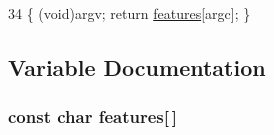 \begin{DoxyCode}
34 \{ (void)argv; \textcolor{keywordflow}{return} \hyperlink{a00016_a1582568e32f689337602a16bf8a5bff0_a1582568e32f689337602a16bf8a5bff0}{features}[argc]; \}
\end{DoxyCode}


\subsection{Variable Documentation}
\subsubsection[{\texorpdfstring{features}{features}}]{\setlength{\rightskip}{0pt plus 5cm}const char features\mbox{[}$\,$\mbox{]}}\hypertarget{a00016_a1582568e32f689337602a16bf8a5bff0_a1582568e32f689337602a16bf8a5bff0}{}\label{a00016_a1582568e32f689337602a16bf8a5bff0_a1582568e32f689337602a16bf8a5bff0}
